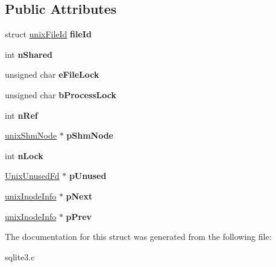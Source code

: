 \subsection*{Public Attributes}
\begin{DoxyCompactItemize}
\item 
struct \hyperlink{structunixFileId}{unix\+File\+Id} {\bfseries file\+Id}\hypertarget{structunixInodeInfo_ae692731d449f4462a921dda9a061faa6}{}\label{structunixInodeInfo_ae692731d449f4462a921dda9a061faa6}

\item 
int {\bfseries n\+Shared}\hypertarget{structunixInodeInfo_a0d7f8dd92964f53e59c8d741dbe00a61}{}\label{structunixInodeInfo_a0d7f8dd92964f53e59c8d741dbe00a61}

\item 
unsigned char {\bfseries e\+File\+Lock}\hypertarget{structunixInodeInfo_a010a765bb3feecb16b650f68fc3a3c1f}{}\label{structunixInodeInfo_a010a765bb3feecb16b650f68fc3a3c1f}

\item 
unsigned char {\bfseries b\+Process\+Lock}\hypertarget{structunixInodeInfo_ade689e4231dd80bb33c86da1e5ed1586}{}\label{structunixInodeInfo_ade689e4231dd80bb33c86da1e5ed1586}

\item 
int {\bfseries n\+Ref}\hypertarget{structunixInodeInfo_a65cbd1fd05ed00f03a252266b04a8221}{}\label{structunixInodeInfo_a65cbd1fd05ed00f03a252266b04a8221}

\item 
\hyperlink{structunixShmNode}{unix\+Shm\+Node} $\ast$ {\bfseries p\+Shm\+Node}\hypertarget{structunixInodeInfo_a302a8b82e27d5b3624ec122bc9c2ed61}{}\label{structunixInodeInfo_a302a8b82e27d5b3624ec122bc9c2ed61}

\item 
int {\bfseries n\+Lock}\hypertarget{structunixInodeInfo_a477f3357a32adbc1a9b05017e535444d}{}\label{structunixInodeInfo_a477f3357a32adbc1a9b05017e535444d}

\item 
\hyperlink{structUnixUnusedFd}{Unix\+Unused\+Fd} $\ast$ {\bfseries p\+Unused}\hypertarget{structunixInodeInfo_a0dda9ad35734fa161d1f0b13b671c1c6}{}\label{structunixInodeInfo_a0dda9ad35734fa161d1f0b13b671c1c6}

\item 
\hyperlink{structunixInodeInfo}{unix\+Inode\+Info} $\ast$ {\bfseries p\+Next}\hypertarget{structunixInodeInfo_a80181ba4ef71dd0d8e55e97baedc761e}{}\label{structunixInodeInfo_a80181ba4ef71dd0d8e55e97baedc761e}

\item 
\hyperlink{structunixInodeInfo}{unix\+Inode\+Info} $\ast$ {\bfseries p\+Prev}\hypertarget{structunixInodeInfo_a6575edce9898b48870c6f48047c01d01}{}\label{structunixInodeInfo_a6575edce9898b48870c6f48047c01d01}

\end{DoxyCompactItemize}


The documentation for this struct was generated from the following file\+:\begin{DoxyCompactItemize}
\item 
sqlite3.\+c\end{DoxyCompactItemize}
